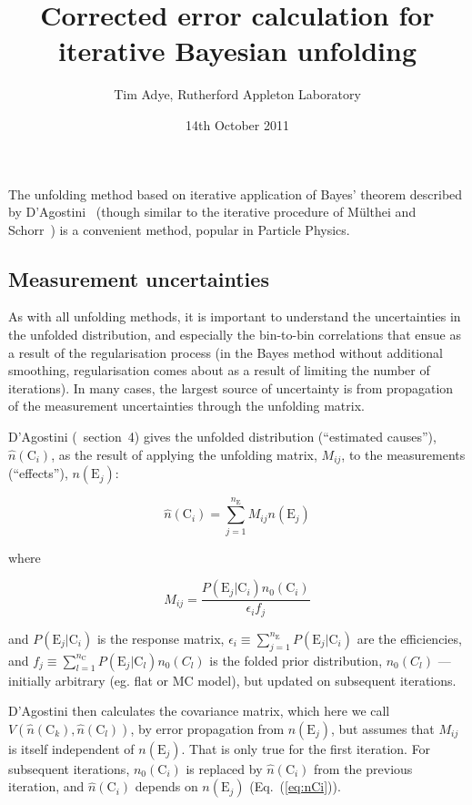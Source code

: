 \documentclass[12pt,a4paper]{article}
\newcommand{\E}{\mathrm{E}}
\newcommand{\C}{\mathrm{C}}
\begin{document}
\title{Corrected error calculation for iterative Bayesian unfolding}
\author{Tim Adye, Rutherford Appleton Laboratory}
\date{14th October 2011}
\maketitle

The unfolding method based on iterative application of Bayes' theorem
described by D'Agostini~\cite{D'Agostini:1994zf}
(though similar to the iterative procedure of
M\"ulthei and Schorr~\cite{Multhei:1986ps})
is a convenient method, popular in Particle Physics.

\subsection{Measurement uncertainties}

As with all unfolding methods, it is important to understand
the uncertainties in the unfolded distribution, and especially the bin-to-bin correlations
that ensue as a result of the regularisation process (in the Bayes method without additional smoothing, regularisation
comes about as a result of limiting the number of iterations).
In many cases, the largest source of uncertainty is from propagation of the measurement
uncertainties through the unfolding matrix.

D'Agostini (\cite{D'Agostini:1994zf}~section~4) gives the unfolded distribution (``estimated causes''), $\hat{n}(\C_i)$,
as the result of applying the unfolding matrix, $M_{ij}$, to the measurements (``effects''), $n(\E_j)$:

\begin{equation}
\hat{n}(\C_i) = \sum_{j=1}^{n_{\E}} M_{ij} n(\E_j)
\label{eq:nCi}
\end{equation}

\noindent where

\begin{equation}
M_{ij} = \frac{P(\E_j|\C_i) n_0(\C_i)}{\epsilon_i f_j}
\end{equation}

\noindent and
$P(\E_j|\C_i)$ is the response matrix,
$\epsilon_i \equiv \sum_{j=1}^{n_{\E}} P(\E_j|\C_i)$ are the efficiencies, and
$f_j \equiv \sum_{l=1}^{n_{\C}} P(\E_j|\C_l) n_0(C_l)$ is the folded
prior distribution, $n_0(C_l)$ --- initially arbitrary (eg. flat or MC model), but updated on
subsequent iterations.

D'Agostini then calculates the covariance matrix, which here we call $V(\hat{n}(\C_k),\hat{n}(\C_l))$,
by error propagation from $n(\E_j)$,
but assumes that $M_{ij}$ is itself independent of $n(\E_j)$. That is only true for the first iteration.
For subsequent iterations, $n_0(\C_i)$ is replaced by $\hat{n}(\C_i)$ from the
previous iteration, and $\hat{n}(\C_i)$ depends on $n(\E_j)$ (Eq.~(\ref{eq:nCi})).
\end{document}
